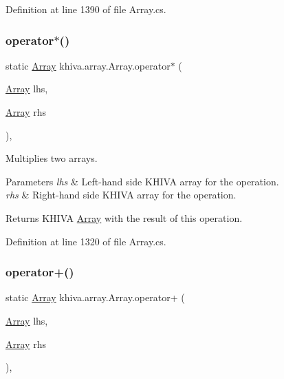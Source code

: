 Definition at line 1390 of file Array.\+cs.

\mbox{\label{classkhiva_1_1array_1_1_array_ac414d3eaa3d9e007d00dac663890e205}} 
\subsubsection{\texorpdfstring{operator$\ast$()}{operator*()}}
{\footnotesize\ttfamily static \mbox{\hyperlink{classkhiva_1_1array_1_1_array}{Array}} khiva.\+array.\+Array.\+operator$\ast$ (\begin{DoxyParamCaption}\item[{\mbox{\hyperlink{classkhiva_1_1array_1_1_array}{Array}}}]{lhs,  }\item[{\mbox{\hyperlink{classkhiva_1_1array_1_1_array}{Array}}}]{rhs }\end{DoxyParamCaption})\hspace{0.3cm}{\ttfamily [inline]}, {\ttfamily [static]}}



Multiplies two arrays. 


\begin{DoxyParams}{Parameters}
{\em lhs} & Left-\/hand side K\+H\+I\+VA array for the operation.\\
\hline
{\em rhs} & Right-\/hand side K\+H\+I\+VA array for the operation.\\
\hline
\end{DoxyParams}
\begin{DoxyReturn}{Returns}
K\+H\+I\+VA \mbox{\hyperlink{classkhiva_1_1array_1_1_array}{Array}} with the result of this operation.
\end{DoxyReturn}


Definition at line 1320 of file Array.\+cs.

\mbox{\label{classkhiva_1_1array_1_1_array_ac9e97f3bcab5b1d144627e859758887a}} 
\subsubsection{\texorpdfstring{operator+()}{operator+()}}
{\footnotesize\ttfamily static \mbox{\hyperlink{classkhiva_1_1array_1_1_array}{Array}} khiva.\+array.\+Array.\+operator+ (\begin{DoxyParamCaption}\item[{\mbox{\hyperlink{classkhiva_1_1array_1_1_array}{Array}}}]{lhs,  }\item[{\mbox{\hyperlink{classkhiva_1_1array_1_1_array}{Array}}}]{rhs }\end{DoxyParamCaption})\hspace{0.3cm}{\ttfamily [inline]}, {\ttfamily [static]}}



